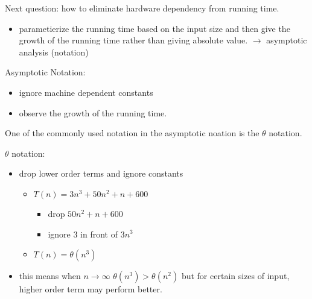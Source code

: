 \documentclass{article}
\begin{document}
    Next question: how to eliminate hardware dependency from running time.
    \begin{itemize}
        \item parametierize the running time based on the input size and then give the 
        growth of the running time rather than giving absolute value. $\rightarrow$ 
        asymptotic analysis (notation)
    \end{itemize}

    Asymptotic Notation:
    \begin{itemize}
        \item ignore machine dependent constants
        \item observe the growth of the running time.
    \end{itemize}
    One of the commonly used notation in the asymptotic noation is the $\theta$ notation.

    $\theta$ notation:
    \begin{itemize}
        \item drop lower order terms and ignore constants 
        \begin{itemize}
            \item $T(n) = 3n^3+50n^2+n+600$
            \begin{itemize}
                \item drop $50n^2+n+600$
                \item ignore $3$ in front of $3n^3$
            \end{itemize}
            \item $T(n)=\theta (n^3)$
        \end{itemize}
        \item this means when $n\rightarrow\infty$ $\theta(n^3)>\theta(n^2)$
        but for certain sizes of input, higher order term may perform better.
    \end{itemize}
    
\end{document}
